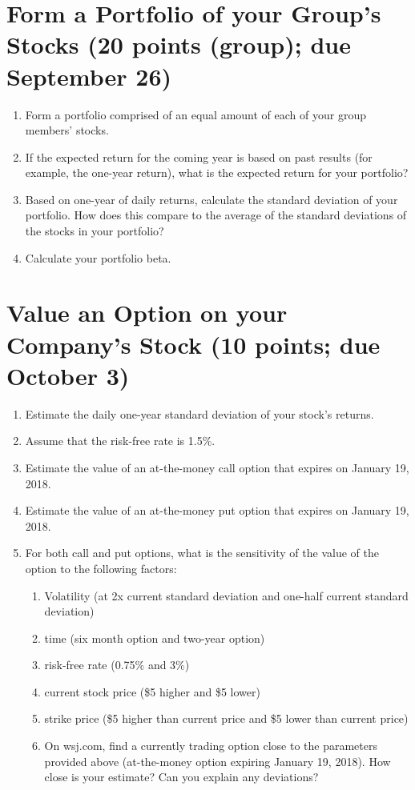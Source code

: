 \section{Form a Portfolio of your Group's Stocks (20 points (group); due September 26)}
\begin{enumerate}
\item Form a portfolio comprised of an equal amount of each of your group members' stocks.
\item If the expected return for the coming year is based on past results (for example, the one-year return), what is the expected return for your portfolio?
\item Based on one-year of daily returns, calculate the standard deviation of your portfolio. How does this compare to the average of the standard deviations of the stocks in your portfolio?
\item Calculate your portfolio beta.
\end{enumerate}
\section{Value an Option on your Company's Stock (10 points; due October 3)}
\begin{enumerate}
\item Estimate the daily one-year standard deviation of your stock's returns.
\item Assume that the risk-free rate is 1.5\%.
\item Estimate the value of an at-the-money call option that expires on January 19, 2018.
\item Estimate the value of an at-the-money put option that expires on January 19, 2018.
\item For both call and put options, what is the sensitivity of the value of the option to the following factors:
\begin{enumerate}
\item Volatility (at 2x current standard deviation and one-half current standard deviation)
\item time (six month option and two-year option)
\item risk-free rate (0.75\% and 3\%)
\item current stock price (\$5 higher and \$5 lower)
\item strike price (\$5 higher than current price and \$5 lower than current price)
\item On wsj.com, find a currently trading option close to the parameters provided above (at-the-money option expiring January 19, 2018). How close is your estimate? Can you explain any deviations?
\end{enumerate}
\end{enumerate}
